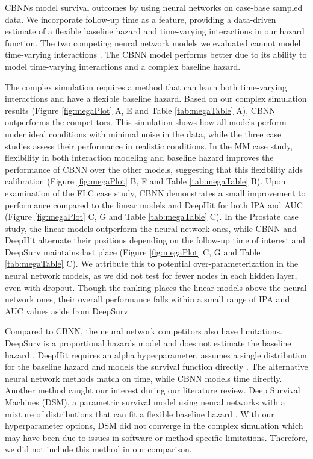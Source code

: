 \documentclass[preprint,12pt]{elsarticle}
\begin{document}
CBNNs model survival outcomes by using neural networks on case-base sampled data. We incorporate follow-up time as a feature, providing a data-driven
estimate of a flexible baseline hazard and time-varying interactions in our hazard function. The two competing neural network models we evaluated cannot
model time-varying interactions \citep{katzman2018DeepSurv} \citep{lee2018DeepHit}. The CBNN model performs better due to its ability to model time-varying
interactions and a complex baseline hazard.

The complex simulation requires a method that can learn both time-varying interactions and have a flexible baseline hazard. Based on our complex simulation results (Figure \ref{fig:megaPlot} A, E and Table \ref{tab:megaTable} A), CBNN
outperforms the competitors. This simulation shows how all models perform under ideal conditions with minimal noise in the data, while the three
case studies assess their performance in realistic conditions. In the MM case study, flexibility in both interaction modeling and baseline hazard
improves the performance of CBNN over the other models, suggesting that this flexibility aids calibration (Figure \ref{fig:megaPlot} B, F and Table
\ref{tab:megaTable} B). Upon examination of the FLC case study, CBNN demonstrates a small improvement to performance compared to the linear
models and DeepHit for both IPA and AUC (Figure \ref{fig:megaPlot} C, G and Table \ref{tab:megaTable} C). In the Prostate case study, the linear
models outperform the neural network ones, while CBNN and DeepHit alternate their positions depending on the follow-up time of interest and DeepSurv
maintains last place (Figure \ref{fig:megaPlot} C, G and Table \ref{tab:megaTable} C). We attribute this to potential over-parameterization in the neural
network models, as we did not test for fewer nodes in each hidden layer, even with dropout. Though the ranking places the linear models above the
neural network ones, their overall performance falls within a small range of IPA and AUC values aside from DeepSurv.

Compared to CBNN, the neural network competitors also have limitations. DeepSurv is a proportional hazards model and does not estimate the baseline
hazard \citep{katzman2018DeepSurv}. DeepHit requires an alpha hyperparameter, assumes a single distribution for the baseline hazard and models the
survival function directly \citep{lee2018DeepHit}. The alternative neural network methods match on time, while CBNN models time directly. Another method
caught our interest during our literature review. Deep Survival Machines (DSM), a parametric survival model using neural networks with a mixture of
distributions that can fit a flexible baseline hazard \citep{dsmPaper}. With our hyperparameter options, DSM did not converge in the complex
simulation which may have been due to issues in software or method specific limitations. Therefore, we did not include this method in our comparison.
\end{document}
